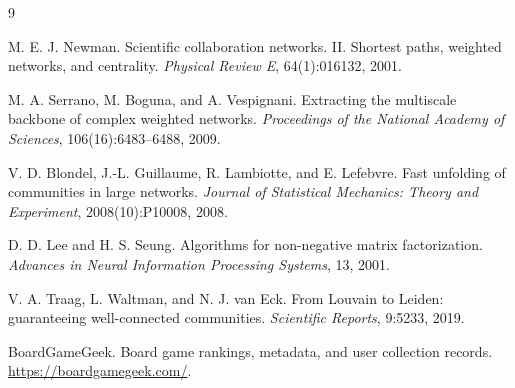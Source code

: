 \documentclass[10pt,twocolumn]{article}
\begin{document}
\begin{thebibliography}{9}

M. E. J. Newman.
\newblock Scientific collaboration networks. II. Shortest paths, weighted networks, and centrality.
\newblock \emph{Physical Review E}, 64(1):016132, 2001.

M. A. Serrano, M. Boguna, and A. Vespignani.
\newblock Extracting the multiscale backbone of complex weighted networks.
\newblock \emph{Proceedings of the National Academy of Sciences}, 106(16):6483--6488, 2009.

V. D. Blondel, J.-L. Guillaume, R. Lambiotte, and E. Lefebvre.
\newblock Fast unfolding of communities in large networks.
\newblock \emph{Journal of Statistical Mechanics: Theory and Experiment}, 2008(10):P10008, 2008.

D. D. Lee and H. S. Seung.
\newblock Algorithms for non-negative matrix factorization.
\newblock \emph{Advances in Neural Information Processing Systems}, 13, 2001.

V. A. Traag, L. Waltman, and N. J. van Eck.
\newblock From Louvain to Leiden: guaranteeing well-connected communities.
\newblock \emph{Scientific Reports}, 9:5233, 2019.

BoardGameGeek.
\newblock Board game rankings, metadata, and user collection records.
\newblock \url{https://boardgamegeek.com/}.

\end{thebibliography}
\end{document}
